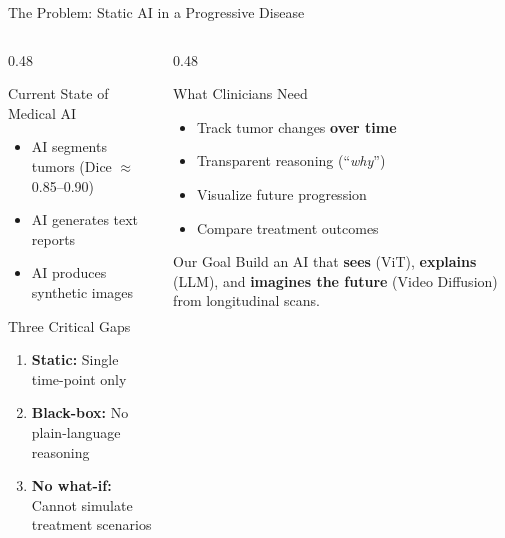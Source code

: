 \documentclass[aspectratio=169,xcolor=dvipsnames]{beamer}
\begin{document}
\begin{frame}{The Problem: Static AI in a Progressive Disease}
    \begin{columns}
        \begin{column}{0.48\textwidth}
            \begin{block}{Current State of Medical AI}
                \begin{itemize}
                    \item AI segments tumors (Dice $\approx$ 0.85--0.90)
                    \item AI generates text reports
                    \item AI produces synthetic images
                \end{itemize}
            \end{block}

            \vspace{0.3em}

            \begin{alertblock}{Three Critical Gaps}
                \begin{enumerate}
                    \item \textbf{Static:} Single time-point only
                    \item \textbf{Black-box:} No plain-language reasoning
                    \item \textbf{No what-if:} Cannot simulate treatment scenarios
                \end{enumerate}
            \end{alertblock}
        \end{column}

        \begin{column}{0.48\textwidth}
            \begin{block}{What Clinicians Need}
                \begin{itemize}
                    \item Track tumor changes \textbf{over time}
                    \item Transparent reasoning (``\textit{why}'')
                    \item Visualize future progression
                    \item Compare treatment outcomes
                \end{itemize}
            \end{block}

            \vspace{0.3em}

            \begin{exampleblock}{Our Goal}
                Build an AI that \textbf{sees} (ViT), \textbf{explains} (LLM), and \textbf{imagines the future} (Video Diffusion) from longitudinal scans.
            \end{exampleblock}
        \end{column}
    \end{columns}
\end{frame}
\end{document}
